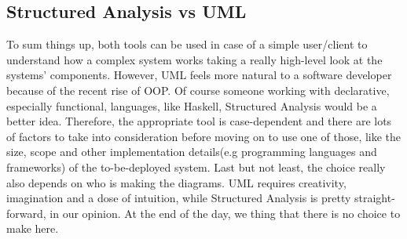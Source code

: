\documentclass{article}
\begin{document}
 

\subsection{Structured Analysis vs UML}
To sum things up, both tools can be used in case of a simple user/client to understand how a complex system works taking a really high-level look
at the systems' components. However, UML feels more natural to a software developer because of the recent rise of OOP.
Of course someone working with declarative, especially functional, languages, like Haskell, Structured Analysis
would be a better idea.
Therefore, the appropriate tool is case-dependent and
there are lots of factors to take into consideration before moving on to use one of those, like the size, scope and
other implementation details(e.g programming languages and frameworks) of the to-be-deployed system.
Last but not least, the choice really also depends on who is making the diagrams. UML requires creativity, imagination and
a dose of intuition, while Structured Analysis is pretty straight-forward, in our opinion. 
At the end of the day, we thing that there is no choice to make here.
\end{document}
